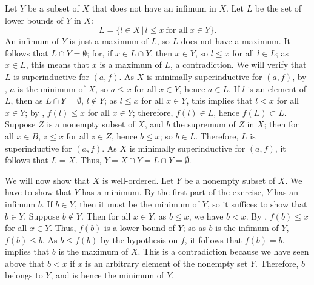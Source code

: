\documentclass{article}
\begin{document}
\begin{solution}[\ref{exe:313bq61a}]
  \label{sol:eh1t1jcm}
  Let \(Y\) be a subset of \(X\) that does not have an infimum in
  \(X\).  Let \(L\) be the set of lower bounds of \(Y\) in \(X\):
  \begin{displaymath}
    L = \{ l \in X \,\vert\, l \leq x ~ \text{for all} ~ x \in Y \}.
  \end{displaymath}
  An infimum of \(Y\) is just a maximum of \(L\), so \(L\) does not
  have a maximum.  It follows that \(L \cap Y = \emptyset\); for, if
  \(x \in L \cap Y\), then \(x \in Y\), so \(l \leq x\) for all
  \(l \in L\); as \(x \in L\), this means that \(x\) is a maximum of
  \(L\), a contradiction.  We will verify that \(L\) is superinductive
  for \((a, f)\).  As \(X\) is minimally superinductive for
  \((a, f)\), by , \(a\) is the minimum of \(X\),
  so \(a \leq x\) for all \(x \in Y\), hence \(a \in L\).  If \(l\) is
  an element of \(L\), then as \(L \cap Y = \emptyset\),
  \(l \notin Y\); as \(l \leq x\) for all \(x \in Y\), this implies
  that \(l < x\) for all \(x \in Y\); by ,
  \(f(l) \leq x\) for all \(x \in Y\); therefore, \(f(l) \in L\),
  hence \(f(L) \subset L\).  Suppose \(Z\) is a nonempty subset of
  \(X\), and \(b\) the supremum of \(Z\) in \(X\); then for all
  \(x \in B\), \(z \leq x\) for all \(z \in Z\), hence \(b \leq x\);
  so \(b \in L\).  Therefore, \(L\) is superinductive for \((a, f)\).
  As \(X\) is minimally superinductive for \((a, f)\), it follows that
  \(L = X\).  Thus, \(Y = X \cap Y = L \cap Y = \emptyset\).

  We will now show that \(X\) is well-ordered.  Let \(Y\) be a
  nonempty subset of \(X\).  We have to show that \(Y\) has a minimum.
  By the first part of the exercise, \(Y\) has an infimum \(b\).  If
  \(b \in Y\), then it must be the minimum of \(Y\), so it suffices to
  show that \(b \in Y\).  Suppose \(b \notin Y\).  Then for all
  \(x \in Y\), as \(b \leq x\), we have \(b < x\).  By
  , \(f(b) \leq x\) for all \(x \in Y\).  Thus,
  \(f(b)\) is a lower bound of \(Y\); so as \(b\) is the infimum of
  \(Y\), \(f(b) \leq b\).  As \(b \leq f(b)\) by the hypothesis on
  \(f\), it follows that \(f(b) = b\).   implies
  that \(b\) is the maximum of \(X\).  This is a contradiction because
  we have seen above that \(b < x\) if \(x\) is an arbitrary element
  of the nonempty set \(Y\).  Therefore, \(b\) belongs to \(Y\), and
  is hence the minimum of \(Y\).
\end{solution}
\end{document}
